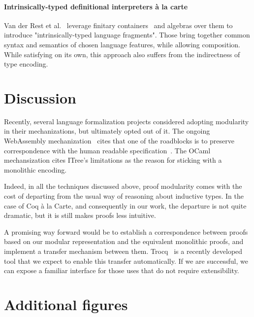 \documentclass[sigplan,nonacm,review]{acmart}
\begin{document}
\paragraph{Intrinsically-typed definitional interpreters {\`a} la carte}
Van der Rest et al.~\cite{van2022intrinsically} leverage finitary containers~\cite{altenkirch2015indexed} and algebras over them to introduce "intrinsically-typed language fragments".
Those bring together common syntax and semantics of chosen language features, while allowing composition. 
%
%
%
%
While satisfying on its own, this approach also suffers from the indirectness of type encoding. 

\section{Discussion}

Recently, several language formalization projects considered adopting modularity in their mechanizations, but ultimately opted out of it. The ongoing WebAssembly mechanization~\cite{rao2025progressful} cites that one of the roadblocks is to preserve correspondence with the human readable specification~\cite{wasm spec}. The OCaml~\cite{brucker2018formal} mechansization cites ITree's limitations as the reason for sticking with a monolithic encoding.

Indeed, in all the techniques discussed above, proof modularity comes with the cost of departing from the usual way of reasoning about inductive types. In the case of Coq à la Carte, and consequently in our work, the departure is not quite dramatic, but it is still makes proofs less intuitive. 

A promising way forward would be to establish a correspondence between proofs based on our modular representation and the equivalent monolithic proofs, and implement a transfer mechanism between them. Trocq~\cite{cohen2024trocq} is a recently developed tool that we expect to enable this transfer automatically. If we are successful, we can expose a familiar interface for those uses that do not require extensibility.





\appendix

\section{Additional figures}
\label{sec:additional-figures}
\end{document}
